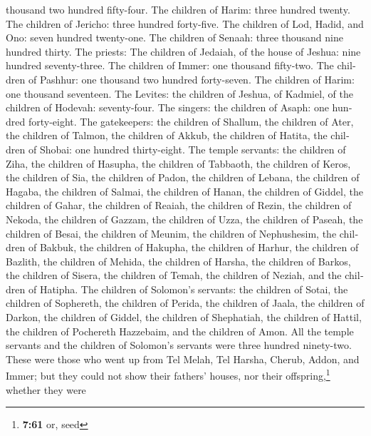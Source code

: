 \begin{paracol}{2}
\begin{otherlanguage}{english}
thousand two hundred fifty-four.  The children of Harim:
three hundred twenty.  The children of Jericho: three
hundred forty-five.  The children of Lod, Hadid, and Ono:
seven hundred twenty-one.  The children of Senaah: three
thousand nine hundred thirty.  The priests: The children
of Jedaiah, of the house of Jeshua: nine hundred seventy-three.
 The children of Immer: one thousand fifty-two.
 The children of Pashhur: one thousand two hundred
forty-seven.  The children of Harim: one thousand
seventeen.  The Levites: the children of Jeshua, of
Kadmiel, of the children of Hodevah: seventy-four.  The
singers: the children of Asaph: one hundred forty-eight. 
The gatekeepers: the children of Shallum, the children of Ater, the
children of Talmon, the children of Akkub, the children of Hatita, the
children of Shobai: one hundred thirty-eight.  The temple
servants: the children of Ziha, the children of Hasupha, the children of
Tabbaoth,  the children of Keros, the children of Sia,
the children of Padon,  the children of Lebana, the
children of Hagaba, the children of Salmai,  the children
of Hanan, the children of Giddel, the children of Gahar, 
the children of Reaiah, the children of Rezin, the children of Nekoda,
 the children of Gazzam, the children of Uzza, the
children of Paseah,  the children of Besai, the children
of Meunim, the children of Nephushesim,  the children of
Bakbuk, the children of Hakupha, the children of Harhur, 
the children of Bazlith, the children of Mehida, the children of Harsha,
 the children of Barkos, the children of Sisera, the
children of Temah,  the children of Neziah, and the
children of Hatipha.  The children of Solomon's servants:
the children of Sotai, the children of Sophereth, the children of
Perida,  the children of Jaala, the children of Darkon,
the children of Giddel,  the children of Shephatiah, the
children of Hattil, the children of Pochereth Hazzebaim, and the
children of Amon.  All the temple servants and the
children of Solomon's servants were three hundred ninety-two.
 These were those who went up from Tel Melah, Tel Harsha,
Cherub, Addon, and Immer; but they could not show their fathers' houses,
nor their offspring,\footnote{\textbf{7:61} or, seed} whether they were

\end{otherlanguage}
\end{paracol}
